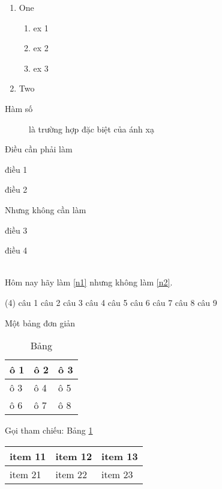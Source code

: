 \documentclass[12pt]{article}
\begin{document}
\begin{enumerate}
	\item One
	\begin{enumerate}
		\item ex 1
		\item ex 2
		\item ex 3
	\end{enumerate}
		\item Two
\end{enumerate}

\begin{description}
	\item[Hàm số] là trường hợp đặc biệt của ánh xạ
\end{description}
	
Điều cần phải làm
\begin{asparaenum}[I]
	\item điều 1
	\item điều 2 \label{n1}
\end{asparaenum}
	
Nhưng không cần làm
\begin{inparaenum}[(a)]
	\item điều 3
	\item điều 4 \label{n2}
\end{inparaenum}\\

Hôm nay hãy làm \ref{n1} nhưng không làm \ref{n2}.

\begin{tasks}[label=\roman*. ](4) %
	\task câu 1
	\task* câu 2
	\task câu 3
	\task câu 4
	\task câu 5
	\task câu 6
	\task câu 7
	\task câu 8
	\task câu 9
\end{tasks}

\newpage

\begin{table}[h]
\begin{center}
Một bảng đơn giản 
\begin{tabular}{ | p{2cm} | m{2cm} | m{2cm} |}
	\hline
	ô 1  & ô 2 & ô 3\\ [0.5ex] 
	\hline\hline
	ô 3 & ô 4 & ô 5\\
	\cline{1-2} 
	ô 6 & ô 7 & ô 8\\
	\hline
\end{tabular}
\end{center}
	\caption{Bảng}
	\label{b1}
\end{table}
Gọi tham chiếu: Bảng \ref{b1}

\newpage
\begin{tabu} to 0.8\textwidth {|X[c]|X[c]|X[c]|}
	\hline
	item 11 & item 12 & item 13 \\
	\hline
	item 21 & item 22 & item 23 \\
	\hline
\end{tabu}
\end{document}
